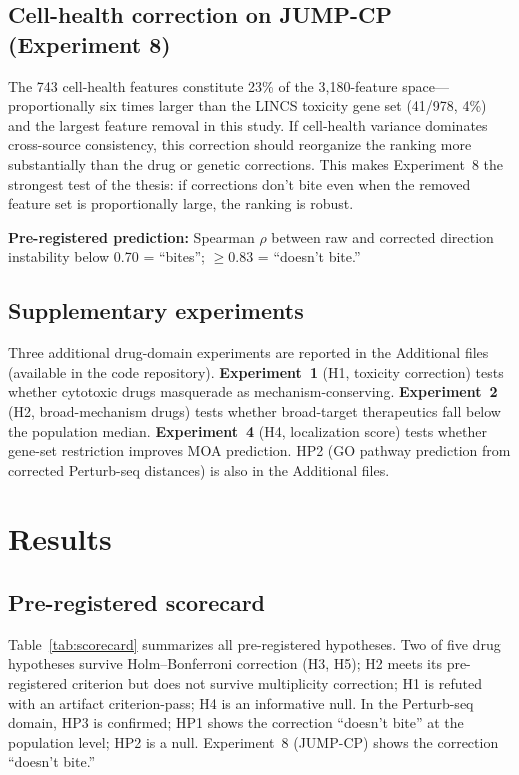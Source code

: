 \documentclass[10pt]{article}
\begin{document}
\subsection{Cell-health correction on JUMP-CP (Experiment 8)}

The 743 cell-health features constitute 23\% of the 3{,}180-feature
space---proportionally six times larger than the LINCS toxicity gene set
(41/978, 4\%) and the largest feature removal in this study. If cell-health
variance dominates cross-source consistency, this correction should
reorganize the ranking more substantially than the drug or genetic
corrections. This makes Experiment~8 the strongest test of the thesis:
if corrections don't bite even when the removed feature set is
proportionally large, the ranking is robust.

\textbf{Pre-registered prediction:} Spearman $\rho$ between raw and
corrected direction instability below 0.70 = ``bites''; $\geq 0.83$ =
``doesn't bite.''

\subsection{Supplementary experiments}

Three additional drug-domain experiments are reported in the Additional
files (available in the code repository). \textbf{Experiment~1}
(H1, toxicity correction) tests whether cytotoxic drugs masquerade as
mechanism-conserving. \textbf{Experiment~2} (H2, broad-mechanism drugs)
tests whether broad-target therapeutics fall below the population median.
\textbf{Experiment~4} (H4, localization score) tests whether gene-set
restriction improves MOA prediction. HP2 (GO pathway prediction from
corrected Perturb-seq distances) is also in the Additional files.

\section{Results}

\subsection{Pre-registered scorecard}

Table~\ref{tab:scorecard} summarizes all pre-registered hypotheses.
Two of five drug hypotheses survive Holm--Bonferroni correction (H3, H5);
H2 meets its pre-registered criterion but does not survive multiplicity
correction; H1 is refuted with an artifact criterion-pass; H4 is an
informative null.
In the Perturb-seq domain, HP3 is confirmed; HP1 shows the correction
``doesn't bite'' at the population level; HP2 is a null. Experiment~8
(JUMP-CP) shows the correction ``doesn't bite.''
\end{document}
